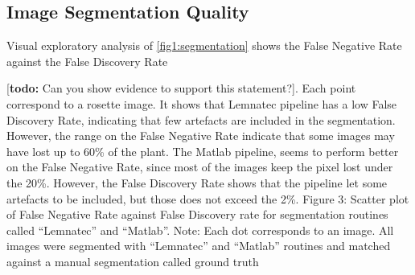 \documentclass{frontiersSCNS} %
\newcommand{\todo}[1]{
  \rule{0pt}{0pt}\marginpar{{\color{blue}\rule{1ex}{1ex}}}
  {[\textbf{\color{blue}todo:} #1]}}
\begin{document}
\subsection{Image Segmentation Quality}
Visual exploratory analysis of \ref{fig1:segmentation} shows the False Negative Rate against the False Discovery Rate \todo{Can you show evidence to support this statement?}. Each point correspond to a rosette image. It shows that Lemnatec pipeline has a low False Discovery Rate, indicating that few artefacts are included in the segmentation. However, the range on the False Negative Rate indicate that some images may have lost up to 60\% of the plant. The Matlab pipeline, seems to perform better on the False Negative Rate, since most of the images keep the pixel lost under the 20\%. However, the False Discovery Rate shows that the pipeline let some artefacts to be included, but those does not exceed the 2\%. 
Figure 3: Scatter plot of False Negative Rate against False Discovery rate for segmentation routines called “Lemnatec” and “Matlab”. Note: Each dot corresponds to an image. All images were segmented with “Lemnatec” and “Matlab” routines and matched against a manual segmentation called ground truth
\end{document}
